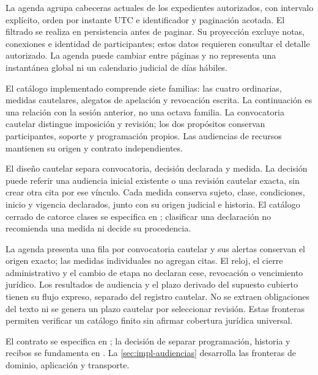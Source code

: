 La agenda agrupa cabeceras actuales de los expedientes autorizados, con intervalo explícito, orden por instante UTC e identificador y paginación acotada. El filtrado se realiza en persistencia antes de paginar. Su proyección excluye notas, conexiones e identidad de participantes; estos datos requieren consultar el detalle autorizado. La agenda puede cambiar entre páginas y no representa una instantánea global ni un calendario judicial de días hábiles.

El cat\'alogo implementado comprende siete familias: las cuatro ordinarias, medidas cautelares, alegatos de apelaci\'on y revocaci\'on escrita. La continuaci\'on es una relaci\'on con la sesi\'on anterior, no una octava familia. La convocatoria cautelar distingue imposici\'on y revisi\'on; los dos prop\'ositos conservan participantes, soporte y programaci\'on propios. Las audiencias de recursos mantienen su origen y contrato independientes.

El dise\~no cautelar separa convocatoria, decisi\'on declarada y medida. La decisi\'on puede referir una audiencia inicial existente o una revisi\'on cautelar exacta, sin crear otra cita por ese v\'inculo. Cada medida conserva sujeto, clase, condiciones, inicio y vigencia declarados, junto con su origen judicial e historia. El cat\'alogo cerrado de catorce clases se especifica en ; clasificar una declaraci\'on no recomienda una medida ni decide su procedencia.

La agenda presenta una fila por convocatoria cautelar y sus alertas conservan el origen exacto; las medidas individuales no agregan citas. El reloj, el cierre administrativo y el cambio de etapa no declaran cese, revocaci\'on o vencimiento jur\'idico. Los resultados de audiencia y el plazo derivado del supuesto cubierto tienen su flujo expreso, separado del registro cautelar. No se extraen obligaciones del texto ni se genera un plazo cautelar por seleccionar revisi\'on. Estas fronteras permiten verificar un cat\'alogo finito sin afirmar cobertura jur\'idica universal.

{\raggedright El contrato se especifica en ; la decisión de separar programación, historia y recibos se fundamenta en . La \cref{sec:impl-audiencias} desarrolla las fronteras de dominio, aplicación y transporte.\par}

